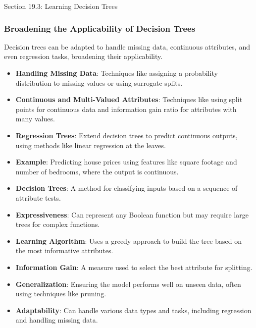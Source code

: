 \begin{notes}{Section 19.3: Learning Decision Trees}
\begin{highlight}
    \end{highlight}
    
    \subsubsection*{Broadening the Applicability of Decision Trees}
    
    Decision trees can be adapted to handle missing data, continuous attributes, and even regression tasks, broadening their applicability.
    
    \begin{highlight}
    
        \begin{itemize}
            \item \textbf{Handling Missing Data}: Techniques like assigning a probability distribution to missing values or using surrogate splits.
            \item \textbf{Continuous and Multi-Valued Attributes}: Techniques like using split points for continuous data and information gain ratio for attributes with many values.
            \item \textbf{Regression Trees}: Extend decision trees to predict continuous outputs, using methods like linear regression at the leaves.
            \item \textbf{Example}: Predicting house prices using features like square footage and number of bedrooms, where the output is continuous.
        \end{itemize}
    
    \end{highlight}
    
    \begin{highlight}
    
        \begin{itemize}
            \item \textbf{Decision Trees}: A method for classifying inputs based on a sequence of attribute tests.
            \item \textbf{Expressiveness}: Can represent any Boolean function but may require large trees for complex functions.
            \item \textbf{Learning Algorithm}: Uses a greedy approach to build the tree based on the most informative attributes.
            \item \textbf{Information Gain}: A measure used to select the best attribute for splitting.
            \item \textbf{Generalization}: Ensuring the model performs well on unseen data, often using techniques like pruning.
            \item \textbf{Adaptability}: Can handle various data types and tasks, including regression and handling missing data.
        \end{itemize}
    

\end{highlight}
\end{notes}
